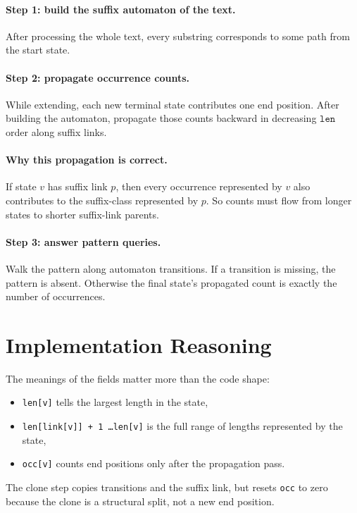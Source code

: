 \paragraph{Step 1: build the suffix automaton of the text.}
After processing the whole text, every substring corresponds to some path from the start state.

\paragraph{Step 2: propagate occurrence counts.}
While extending, each new terminal state contributes one end position. After building the automaton, propagate those
counts backward in decreasing \(\texttt{len}\) order along suffix links.

\paragraph{Why this propagation is correct.}
If state \(v\) has suffix link \(p\), then every occurrence represented by \(v\) also contributes to the suffix-class
represented by \(p\). So counts must flow from longer states to shorter suffix-link parents.

\paragraph{Step 3: answer pattern queries.}
Walk the pattern along automaton transitions. If a transition is missing, the pattern is absent. Otherwise the final
state's propagated count is exactly the number of occurrences.

\section*{Implementation Reasoning}

The meanings of the fields matter more than the code shape:

\begin{itemize}
  \item \texttt{len[v]} tells the largest length in the state,
  \item \texttt{len[link[v]] + 1 \ldots len[v]} is the full range of lengths represented by the state,
  \item \texttt{occ[v]} counts end positions only after the propagation pass.
\end{itemize}

The clone step copies transitions and the suffix link, but resets \texttt{occ} to zero because the clone is a structural
split, not a new end position.

